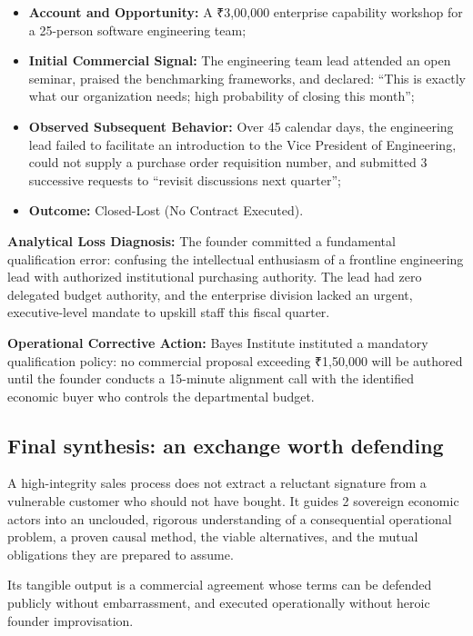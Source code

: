 \begin{itemize}
\item \textbf{Account and Opportunity:} A ₹3,00,000 enterprise capability workshop for a 25-person software engineering team;
\item \textbf{Initial Commercial Signal:} The engineering team lead attended an open seminar, praised the benchmarking frameworks, and declared: ``This is exactly what our organization needs; high probability of closing this month'';
\item \textbf{Observed Subsequent Behavior:} Over 45 calendar days, the engineering lead failed to facilitate an introduction to the Vice President of Engineering, could not supply a purchase order requisition number, and submitted 3 successive requests to ``revisit discussions next quarter'';
\item \textbf{Outcome:} Closed-Lost (No Contract Executed).
\end{itemize}

\textbf{Analytical Loss Diagnosis:} The founder committed a fundamental qualification error: confusing the intellectual enthusiasm of a frontline engineering lead with authorized institutional purchasing authority. The lead had zero delegated budget authority, and the enterprise division lacked an urgent, executive-level mandate to upskill staff this fiscal quarter.

\textbf{Operational Corrective Action:} Bayes Institute instituted a mandatory qualification policy: no commercial proposal exceeding ₹1,50,000 will be authored until the founder conducts a 15-minute alignment call with the identified economic buyer who controls the departmental budget.

\subsection*{Final synthesis: an exchange worth defending}

A high-integrity sales process does not extract a reluctant signature from a vulnerable customer who should not have bought. It guides 2 sovereign economic actors into an unclouded, rigorous understanding of a consequential operational problem, a proven causal method, the viable alternatives, and the mutual obligations they are prepared to assume.

Its tangible output is a commercial agreement whose terms can be defended publicly without embarrassment, and executed operationally without heroic founder improvisation.

